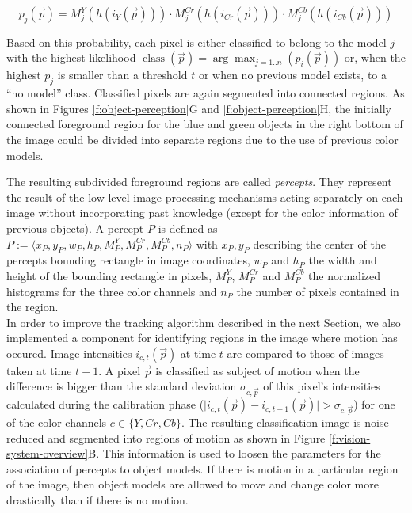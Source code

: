 $$p_{j}(\vec{p})=M^Y_{j}(h(i_Y(\vec{p}))) \cdot M_{j}^{Cr}(h(i_{Cr}(\vec{p}))) \cdot M_{j}^{Cb}(h(i_{Cb}
(\vec{p})))$$

\noindent Based on this probability, each pixel is either classified
to belong to the model $j$ with the highest likelihood
$\operatorname{class}({\vec{p}})=\arg\max_{j=1..n}(p_{i}(\vec{p}))$
or, when the highest $p_{j}$ is smaller than a threshold $t$ or when
no previous model exists, to a ``no model'' class. Classified pixels
are again segmented into connected regions. As shown in Figures
\ref{f:object-perception}G and \ref{f:object-perception}H, the
initially connected foreground region for the blue and green objects
in the right bottom of the image could be divided into separate
regions due to the use of previous color models.


The resulting subdivided foreground regions are called
\emph{percepts}.  They represent the result of the low-level image
processing mechanisms acting separately on each image without
incorporating past knowledge (except for the color information of
previous objects). A percept $P$ is defined as $P:=\langle
x_P,y_P,w_P,h_P,M_P^Y,M_P^{Cr},M_P^{Cb},n_P\rangle$ with $x_P,y_P$
describing the center of the percepts bounding rectangle in image
coordinates, $w_P$ and $h_P$ the width and height of the bounding
rectangle in pixels, $M_P^Y$, $M_P^{Cr}$ and $M_P^{Cb}$ the normalized
histograms for the three color channels and $n_P$ the number of pixels
contained in the region.\\

\noindent In order to improve the tracking algorithm described in the next
Section, we also implemented a component for identifying regions in
the image where motion has occured. Image intensities
$i_{c,t}(\vec{p})$ at time $t$ are compared to those of images taken
at time $t-1$. A pixel $\vec{p}$ is classified as subject of motion
when the difference is bigger than the standard deviation
$\sigma_{c,\vec{p}}$ of this pixel's intensities calculated during the
calibration phase ($\mid i_{c,t}(\vec{p}) - i_{c,t-1}(\vec{p})\mid >
\sigma_{c,\vec{p}}$) for one of the color channels $c
\in\{Y,Cr,Cb\}$. The resulting classification image is noise-reduced
and segmented into regions of motion as shown in Figure
\ref{f:vision-system-overview}B. This information is used to loosen
the parameters for the association of percepts to object models.  If
there is motion in a particular region of the image, then object
models are allowed to move and change color more drastically than if
there is no motion.



